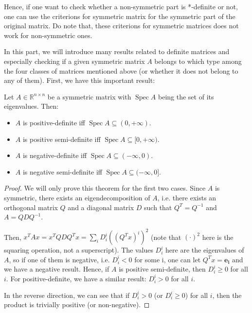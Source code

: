 Hence, if one want to check whether a non-symmetric part is *-definite or not,
one can use the criterions for symmetric matrix for the symmetric part of the
original matrix. Do note that, these criterions for symmetric matrices does not
work for non-symmetric ones.

In this part, we will introduce many results related to definite matrices and
especially checking if a given symmetric matrix \( A \) belongs to which type among the
four classes of matrices mentioned above (or whether it does not belong to any
of them). First, we have this important result:

\begin{theorem}
\label{thr:Eigenvalues of a definite matrix}
  Let \( A \in \mathbb{R}^{n\times n} \) be a symmetric matrix with \(
  \operatorname{Spec} A \) being the set of its eigenvalues. Then:
  \begin{itemize}
  \item \( A \) is positive-definite iff \( \operatorname{Spec} A \subseteq (0,
    +\infty) \).
  \item \( A \) is positive semi-definite iff \( \operatorname{Spec} A \subseteq [0,
    +\infty) \).
  \item \( A \) is negative-definite iff \( \operatorname{Spec} A \subseteq
    (-\infty, 0)\).
  \item \( A \) is negative semi-definite iff \( \operatorname{Spec} A \subseteq
    (-\infty, 0]\).
  \end{itemize}
\end{theorem}

\begin{proof}
  We will only prove this theorem for the first two cases. Since \( A \) is
  symmetric, there exists an eigendecomposition of \( A \), i.e. there exists an
  orthogonal matrix \( Q \) and a diagonal matrix \( D \) such that \( Q^{T} =
  Q^{-1} \) and \( A = QDQ^{-1} \).

  Then, \( x^{T}Ax = x^{T}QDQ^{T}x = \sum_{i} D^{i}_{i}((Q^{T}x)^{i})^2 \) (note
  that \( (\cdot)^2 \) here is the squaring operation, not a superscript). The
  values \( D_{i}^{i} \) here are the eigenvalues of \( A \), so if one of them
  is negative, i.e. \( D^{i}_{i} < 0 \) for some i, one can let \( Q^{T}x =
  \mathbf{e_{i}} \) and we have a negative result. Hence, if \( A \) is
  positive semi-definite, then \( D^{i}_{i} \ge 0 \) for all \( i \). For
  positive-definite, we have a similar result: \( D^{i}_{i} > 0 \) for all \( i
  \).

  In the reverse direction, we can see that if \( D^{i}_{i} > 0 \) (or \(
  D^{i}_{i} \ge 0 \)) for all \( i
  \), then the product is trivially positive (or non-negative).
\end{proof}

